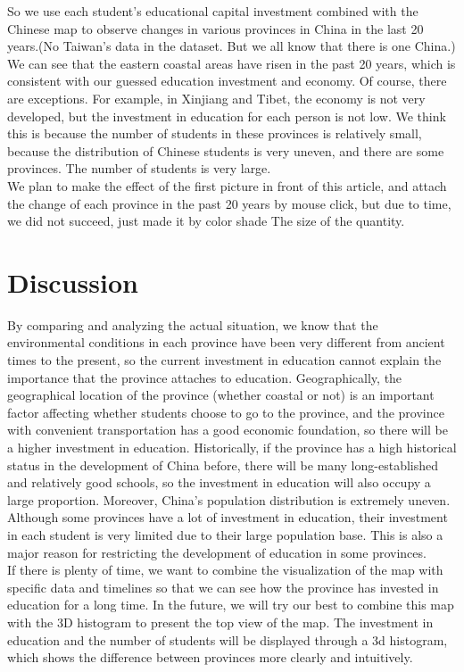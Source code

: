 \noindent So we use each student's educational capital investment combined with the Chinese map to observe changes in various provinces in China in the last 20 years.(No Taiwan's data in the dataset. But we all know that there is one China.)  We can see that the eastern coastal areas have risen in the past 20 years, which is consistent with our guessed education investment and economy.  Of course, there are exceptions. For example, in Xinjiang and Tibet, the economy is not very developed, but the investment in education for each person is not low. We think this is because the number of students in these provinces is relatively small, because the distribution of Chinese students is very uneven, and there are some provinces. The number of students is very large.\\

\noindent We plan to make the effect of the first picture in front of this article, and attach the change of each province in the past 20 years by mouse click, but due to time, we did not succeed, just made it by color shade The size of the quantity.

\section{Discussion}
By comparing and analyzing the actual situation, we know that the environmental conditions in each province have been very different from ancient times to the present, so the current investment in education cannot explain the importance that the province attaches to education. Geographically, the geographical location of the province (whether coastal or not) is an important factor affecting whether students choose to go to the province, and the province with convenient transportation has a good economic foundation, so there will be a higher investment in education. Historically, if the province has a high historical status in the development of China before, there will be many long-established and relatively good schools, so the investment in education will also occupy a large proportion. Moreover, China's population distribution is extremely uneven. Although some provinces have a lot of investment in education, their investment in each student is very limited due to their large population base. This is also a major reason for restricting the development of education in some provinces.\\

\noindent If there is plenty of time, we want to combine the visualization of the map with specific data and timelines so that we can see how the province has invested in education for a long time. In the future, we will try our best to combine this map with the 3D histogram to present the top view of the map. \cite{du20043}The investment in education and the number of students will be displayed through a 3d histogram, which shows the difference between provinces more clearly and intuitively\cite{satyanarayan2014declarative}.

